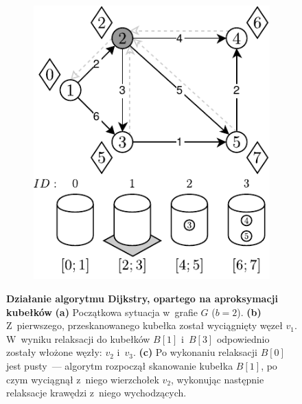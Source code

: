 \begin{figure}[!htbp]
\begin{subfigure}[b]{0.27\textwidth}
		\caption{}
	\end{subfigure}
	\begin{subfigure}[b]{0.27\textwidth}
		\includegraphics[width=\textwidth]{Chapter_II/APROXIMATE-BUCKETS-Example/c.pdf}
		\caption{}
	\end{subfigure}
	\caption{\textbf{Działanie algorytmu Dijkstry, opartego na aproksymacji kubełków} \textbf{(a)} Początkowa sytuacja w~grafie $G$ ($b=2$). \textbf{(b)} Z~pierwszego, przeskanowanego kubełka został wyciągnięty węzeł $v_{1}$. W~wyniku relaksacji do kubełków $B \left[ 1 \right]$ i~$B \left[ 3 \right]$ odpowiednio zostały włożone węzły: $v_{2}$ i~$v_{3}$.  \textbf{(c)} Po wykonaniu relaksacji $B \left[ 0 \right]$ jest pusty~--- algorytm rozpoczął skanowanie kubełka $B \left[ 1 \right]$, po czym wyciągnął z~niego wierzchołek $v_{2}$, wykonując następnie relaksacje krawędzi z~niego wychodzących. } \label{fig:exampleAproximateBuckets1}
\end{figure}

